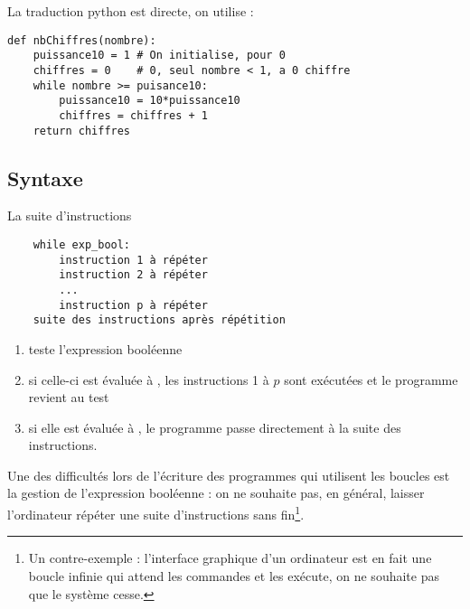 La traduction python est directe, on utilise  : 
\begin{lstlisting}
def nbChiffres(nombre):
    puissance10 = 1 # On initialise, pour 0
    chiffres = 0    # 0, seul nombre < 1, a 0 chiffre
    while nombre >= puisance10:
        puissance10 = 10*puissance10
        chiffres = chiffres + 1
    return chiffres
\end{lstlisting}
\subsection{Syntaxe}
\begin{defin}
La suite d'instructions 

{\normalfont
\begin{lstlisting}
    while exp_bool:
        instruction 1 à répéter
        instruction 2 à répéter
        ...
        instruction p à répéter
    suite des instructions après répétition
\end{lstlisting}
}
\begin{enumerate}
  \item teste l'expression booléenne 
  \item si celle-ci est évaluée à , les instructions 1 à $p$ sont exécutées et le programme revient au test
  \item si elle est évaluée à , le programme passe directement à la suite des instructions.
\end{enumerate}
\end{defin}

Une des difficultés lors de l'écriture des programmes qui utilisent les boucles  est la gestion de l'expression booléenne : on ne souhaite pas, en général, laisser l'ordinateur répéter une suite d'instructions sans fin\footnote{Un contre-exemple : l'interface graphique d'un ordinateur est en fait une boucle infinie qui attend les commandes et les exécute, on ne souhaite pas que le système cesse.}.  

